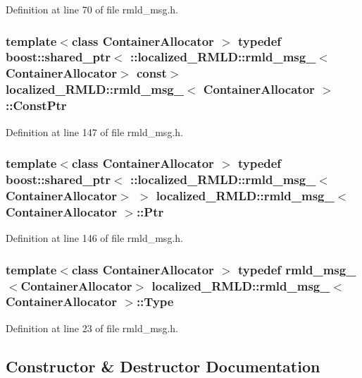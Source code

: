Definition at line 70 of file rmld\_\-msg.h.

\subsubsection[{ConstPtr}]{\setlength{\rightskip}{0pt plus 5cm}template$<$class ContainerAllocator $>$ typedef boost::shared\_\-ptr$<$ ::{\bf localized\_\-RMLD::rmld\_\-msg\_\-}$<$ContainerAllocator$>$ const$>$ {\bf localized\_\-RMLD::rmld\_\-msg\_\-}$<$ ContainerAllocator $>$::{\bf ConstPtr}}\label{structlocalized__RMLD_1_1rmld__msg___ad6ae692d915a1d3a0cd0797b6ee528e4}


Definition at line 147 of file rmld\_\-msg.h.

\subsubsection[{Ptr}]{\setlength{\rightskip}{0pt plus 5cm}template$<$class ContainerAllocator $>$ typedef boost::shared\_\-ptr$<$ ::{\bf localized\_\-RMLD::rmld\_\-msg\_\-}$<$ContainerAllocator$>$ $>$ {\bf localized\_\-RMLD::rmld\_\-msg\_\-}$<$ ContainerAllocator $>$::{\bf Ptr}}\label{structlocalized__RMLD_1_1rmld__msg___a0263a92508e34c309ce8746b224bb06b}


Definition at line 146 of file rmld\_\-msg.h.

\subsubsection[{Type}]{\setlength{\rightskip}{0pt plus 5cm}template$<$class ContainerAllocator $>$ typedef {\bf rmld\_\-msg\_\-}$<$ContainerAllocator$>$ {\bf localized\_\-RMLD::rmld\_\-msg\_\-}$<$ ContainerAllocator $>$::{\bf Type}}\label{structlocalized__RMLD_1_1rmld__msg___a6ed10d15ac8486d9142279931b4789e0}


Definition at line 23 of file rmld\_\-msg.h.



\subsection{Constructor \& Destructor Documentation}
